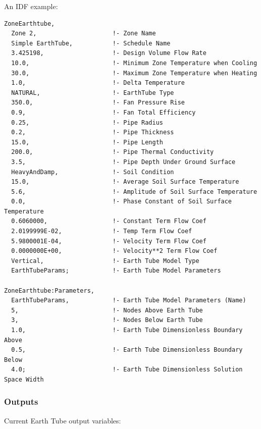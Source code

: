 An IDF example:

\begin{lstlisting}
ZoneEarthtube,
  Zone 2,                     !- Zone Name
  Simple EarthTube,           !- Schedule Name
  3.425198,                   !- Design Volume Flow Rate
  10.0,                       !- Minimum Zone Temperature when Cooling
  30.0,                       !- Maximum Zone Temperature when Heating
  1.0,                        !- Delta Temperature
  NATURAL,                    !- EarthTube Type
  350.0,                      !- Fan Pressure Rise
  0.9,                        !- Fan Total Efficiency
  0.25,                       !- Pipe Radius
  0.2,                        !- Pipe Thickness
  15.0,                       !- Pipe Length
  200.0,                      !- Pipe Thermal Conductivity
  3.5,                        !- Pipe Depth Under Ground Surface
  HeavyAndDamp,               !- Soil Condition
  15.0,                       !- Average Soil Surface Temperature
  5.6,                        !- Amplitude of Soil Surface Temperature
  0.0,                        !- Phase Constant of Soil Surface Temperature
  0.6060000,                  !- Constant Term Flow Coef
  2.0199999E-02,              !- Temp Term Flow Coef
  5.9800001E-04,              !- Velocity Term Flow Coef
  0.0000000E+00,              !- Velocity**2 Term Flow Coef
  Vertical,                   !- Earth Tube Model Type
  EarthTubeParams;            !- Earth Tube Model Parameters

ZoneEarthtube:Parameters,
  EarthTubeParams,            !- Earth Tube Model Parameters (Name)
  5,                          !- Nodes Above Earth Tube
  3,                          !- Nodes Below Earth Tube
  1.0,                        !- Earth Tube Dimensionless Boundary Above
  0.5,                        !- Earth Tube Dimensionless Boundary Below
  4.0;                        !- Earth Tube Dimensionless Solution Space Width
\end{lstlisting}

\subsubsection{Outputs}\label{zoneearthtube-outputs}

Current Earth Tube output variables:

